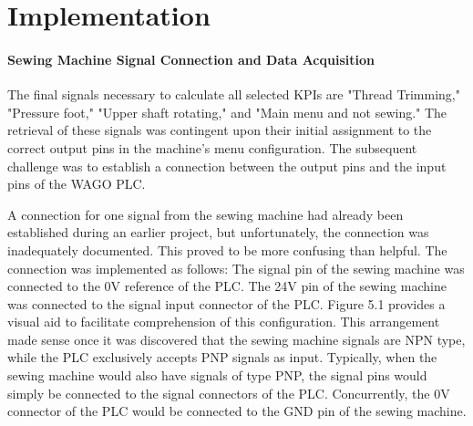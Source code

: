 \clearpage
\chapter{\textbf{Implementation}}\label{Implementation}
\subsubsection{Sewing Machine Signal Connection and Data Acquisition}
The final signals necessary to calculate all selected KPIs are "Thread Trimming," "Pressure foot," "Upper shaft rotating," and "Main menu and not sewing." The retrieval of these signals was contingent upon their initial assignment to the correct output pins in the machine's menu configuration. The subsequent challenge was to establish a connection between the output pins and the input pins of the WAGO PLC.

A connection for one signal from the sewing machine had already been established during an earlier project, but unfortunately, the connection was inadequately documented. This proved to be more confusing than helpful. The connection was implemented as follows: The signal pin of the sewing machine was connected to the 0V reference of the PLC. The 24V pin of the sewing machine was connected to the signal input connector of the PLC. Figure 5.1 provides a visual aid to facilitate comprehension of this configuration. This arrangement made sense once it was discovered that the sewing machine signals are NPN type, while the PLC exclusively accepts PNP signals as input. Typically, when the sewing machine would also have signals of type PNP, the signal pins would simply be connected to the signal connectors of the PLC. Concurrently, the 0V connector of the PLC would be connected to the GND pin of the sewing machine.

